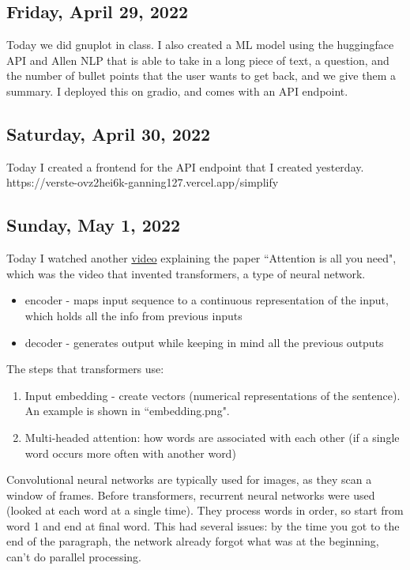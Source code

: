 \documentclass[11pt,letterpaper]{article}
\begin{document}
\subsection{Friday, April 29, 2022}
Today we did gnuplot in class. I also created a ML model using the huggingface API and Allen NLP that is able to take in a long piece of text, a question, and the number of bullet points that the user wants to get back, and we give them a summary. I deployed this on gradio, and comes with an API endpoint.

\subsection{Saturday, April 30, 2022}
Today I created a frontend for the API endpoint that I created yesterday. https://verste-ovz2hei6k-ganning127.vercel.app/simplify

\subsection{Sunday, May 1, 2022}
Today I watched another \href{https://www.youtube.com/watch?v=4Bdc55j80l8}{video} explaining the paper ``Attention is all you need", which was the video that invented transformers, a type of neural network.
\begin{itemize}
    \item encoder - maps input sequence to a continuous representation of the input, which holds all the info from previous inputs
    \item decoder - generates output while keeping in mind all the previous outputs
\end{itemize}

The steps that transformers use:
\begin{enumerate}
    \item Input embedding - create vectors (numerical representations of the sentence). An example is shown in ``embedding.png".
    \item Multi-headed attention: how words are associated with each other (if a single word occurs more often with another word)
\end{enumerate}

Convolutional neural networks are typically used for images, as they scan a window of frames. Before transformers, recurrent neural networks were used (looked at each word at a single time). They process words in order, so start from word 1 and end at final word. This had several issues: by the time you got to the end of the paragraph, the network already forgot what was at the beginning, can't do parallel processing. 
\end{document}
